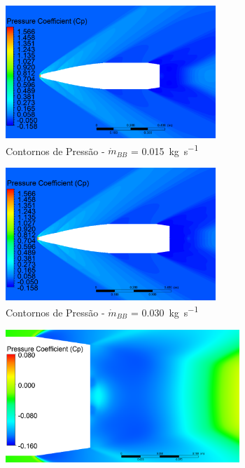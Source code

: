 \begin{figure}[!ht]
	\centering
	\begin{subfigure}[b]{0.47\textwidth} %
        \centering
        \includegraphics[height=5cm,width=\textwidth]{contorno-pressao-2306K-vazao-0015-1pol.png}
        \caption{Contornos de Pressão - \(\Dot{m}_{BB}\) = \qty{0,015}{\kilogram\per\second}}
        \label{fig:contorno-pressao-bb-1pol-vazao0015}
    \end{subfigure}
    \hfill
    \begin{subfigure}[b]{0.47\textwidth} %
        \centering
        \includegraphics[height=5cm,width=\textwidth]{contorno-pressao-2306K-vazao-0030-1pol.png}
        \caption{Contornos de Pressão - \(\Dot{m}_{BB}\) = \qty{0,030}{\kilogram\per\second}}
        \label{fig:contorno-pressao-bb-1pol-vazao0030}
    \end{subfigure}
    \hfill
    \begin{subfigure}[b]{0.47\textwidth} %
        \centering
        \includegraphics[height=5cm,width=\textwidth]{coeficientepressao-vazao0015-temp2306-diam1pol.png}

\end{subfigure}
\end{figure}
